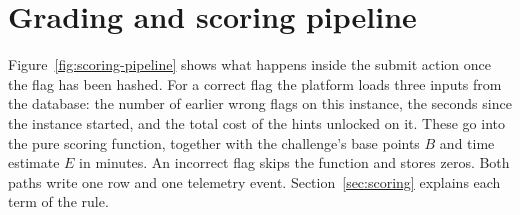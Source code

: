 
\section{Grading and scoring pipeline}

Figure~\ref{fig:scoring-pipeline} shows what happens inside the submit action once the flag has been hashed. For a correct flag the platform loads three inputs from the database: the number of earlier wrong flags on this instance, the seconds since the instance started, and the total cost of the hints unlocked on it. These go into the pure scoring function, together with the challenge's base points $B$ and time estimate $E$ in minutes. An incorrect flag skips the function and stores zeros. Both paths write one  row and one telemetry event. Section~\ref{sec:scoring} explains each term of the rule.

